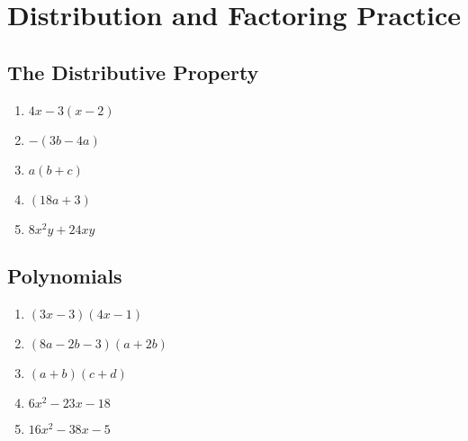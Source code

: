 \documentclass{article}
\begin{document}
    \section*{Distribution and Factoring Practice}
    \begin{multicols}{2}
        \subsection*{The Distributive Property}
        \begin{enumerate}
            \item $4x - 3(x - 2)$
            \vspace{0.5cm}
            \item $-(3b - 4a)$
            \vspace{0.5cm}
            \item $a(b + c)$
            \vspace{0.5cm}
            \item $(18a + 3)$
            \vspace{0.5cm}
            \item $8x^2 y + 24xy$
            \vspace{0.5cm}
        \end{enumerate}
        \subsection*{Polynomials}
        \begin{enumerate}
            \item $(3x - 3)(4x - 1)$
            \vspace{0.5cm}
            \item $(8a - 2b - 3)(a + 2b)$
            \vspace{0.5cm}
            \item $(a + b)(c + d)$
            \vspace{0.5cm}
            \item $6x^2 - 23x - 18$
            \vspace{0.5cm}
            \item $16x^2 - 38x - 5$
            \vspace{0.5cm}
        \end{enumerate}

\end{multicols}
\end{document}
